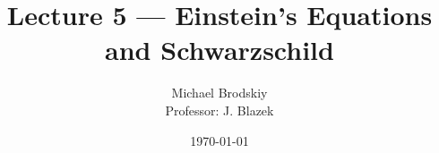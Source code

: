 


\title{Lecture 5 — Einstein's Equations and Schwarzschild}
\date{\today}
\author{Michael Brodskiy\\ \small Professor: J. Blazek}



\maketitle

